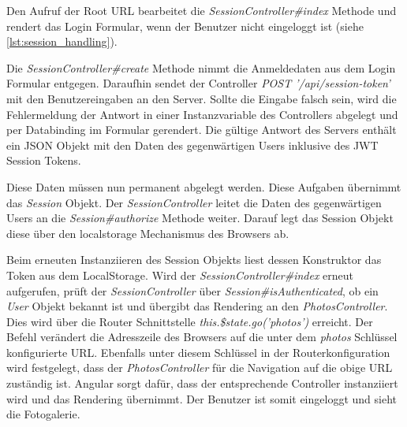 Den Aufruf der Root URL bearbeitet die \textit{SessionController\#index} Methode und rendert das Login Formular, wenn der Benutzer nicht eingeloggt ist (siehe \ref{lst:session_handling}).

Die \textit{SessionController\#create} Methode nimmt die Anmeldedaten aus dem Login Formular entgegen. Daraufhin sendet der Controller \textit{POST '/api/session-token'} mit den Benutzereingaben an den Server. Sollte die Eingabe falsch sein, wird die Fehlermeldung der Antwort in einer Instanzvariable des Controllers abgelegt und per Databinding im Formular gerendert. Die gültige Antwort des Servers enthält ein JSON Objekt mit den Daten des gegenwärtigen Users inklusive des JWT Session Tokens. 

Diese Daten müssen nun permanent abgelegt werden. Diese Aufgaben übernimmt das \textit{Session} Objekt. Der \textit{SessionController} leitet die Daten des gegenwärtigen Users an die \textit{Session\#authorize} Methode weiter. Darauf legt das Session Objekt diese über den \gls{localstorage} Mechanismus des Browsers ab. 

Beim erneuten Instanziieren des Session Objekts liest dessen Konstruktor das Token aus dem LocalStorage. Wird der \textit{SessionController\#index} erneut aufgerufen, prüft der \textit{SessionController} über \textit{Session\#isAuthenticated}, ob ein \textit{User} Objekt bekannt ist und übergibt das Rendering an den \textit{PhotosController}. Dies wird über die Router Schnittstelle \textit{this.\$state.go('photos')} erreicht. Der Befehl verändert die Adresszeile des Browsers auf die unter dem  \textit{photos} Schlüssel konfigurierte URL. Ebenfalls unter diesem Schlüssel in der Routerkonfiguration
wird festgelegt, dass der \textit{PhotosController} für die Navigation auf die obige URL zuständig ist. Angular sorgt dafür, dass der entsprechende Controller instanziiert wird und das Rendering übernimmt. Der Benutzer ist somit eingeloggt und sieht die Fotogalerie.

